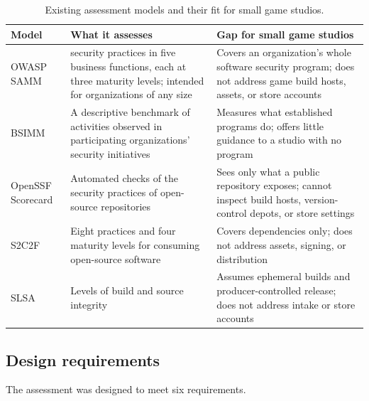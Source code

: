 \documentclass[acmsmall,screen,review]{acmart}
\begin{document}
\begin{table}[htbp]
\caption{Existing assessment models and their fit for small game studios.}
\label{tab:5}
\small
\begin{tabularx}{\linewidth}{@{}>{\hsize=0.428\hsize\raggedright\arraybackslash}X>{\hsize=1.286\hsize\raggedright\arraybackslash}X>{\hsize=1.286\hsize\raggedright\arraybackslash}X@{}}
\toprule
\textbf{Model} & \textbf{What it assesses} & \textbf{Gap for small game studios} \\
\midrule
OWASP SAMM \cite{owaspndsoftware} & 15 security practices in five business functions, each at three maturity levels; intended for organizations of any size & Covers an organization's whole software security program; does not address game build hosts, assets, or store accounts \\
BSIMM \cite{blackndbuilding} & A descriptive benchmark of activities observed in participating organizations' security initiatives & Measures what established programs do; offers little guidance to a studio with no program \\
OpenSSF Scorecard \cite{zahan2023openssf} & Automated checks of the security practices of open-source repositories & Sees only what a public repository exposes; cannot inspect build hosts, version-control depots, or store settings \\
S2C2F \cite{openndsecure} & Eight practices and four maturity levels for consuming open-source software & Covers dependencies only; does not address assets, signing, or distribution \\
SLSA \cite{openndslsa} & Levels of build and source integrity & Assumes ephemeral builds and producer-controlled release; does not address intake or store accounts \\
\bottomrule
\end{tabularx}
\end{table}


\subsection{Design requirements}\label{sec:6.3}

The assessment was designed to meet six requirements.
\end{document}
